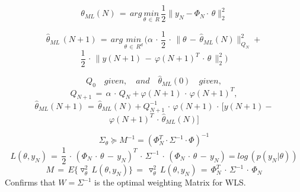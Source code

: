 \begin{tcolorbox}[colback=yellow!5!white,colframe=yellow!75!white,coltitle=black,title=Recursive Linear Least Squares]
\begin{equation*}
\theta _{ ML }(N) \, = \, arg\, \underset { \theta \, \in \, { R } }{ min } \, \frac { 1 }{ 2 } \parallel y_N - \Phi_N\cdot\,\theta{ \parallel  }_{ 2 }^{ 2 }
\end{equation*}

\begin{equation*}
\hat { \theta  } _{ ML }\, (N+1)\, =\, arg\, \underset { \theta \, \in \, { R^{ d } } }{ min } \, (\alpha \, \cdot \, \frac { 1 }{ 2 } \, \cdot \, \parallel \theta \, - \, \hat { \theta  } _{ ML }(N){ \parallel  }_{ Q_{ N } }^{ 2 }+
\end{equation*}
\begin{equation*}
\frac { 1 }{ 2 } \, \cdot \, \parallel y(N+1) \, - \, \varphi (N+1)^{ T }\, \cdot \, \theta \, { \parallel  }_{ 2 }^{ 2 })
\end{equation*}

\begin{equation*}
Q_{ 0 }\quad given,\quad and\quad \hat { \theta  } _{ ML }(0)\quad given,
\end{equation*}
\begin{equation*}
Q_{ N+1 }\, =\, \alpha \, \cdot \, Q_{ N }+\varphi (N+1)\, \cdot \, \varphi (N+1)^{ T },
\end{equation*}
\begin{equation*}
\hat { \theta  } _{ ML }(N+1)\, =\, \hat { \theta  } _{ ML }(N)+Q_{ N+1 }^{ -1 }\, \cdot \, \varphi (N+1)\, \cdot \, [y(N+1)-
\end{equation*}
\begin{equation*}
\varphi(N+1)^T \, \cdot \,\hat{\theta}_{ML}(N)]
\end{equation*}
\end{tcolorbox}

\begin{tcolorbox}[colback=yellow!5!white,colframe=yellow!75!white,coltitle=black,title=Cramer-Rao-Inequality (Fisher information Matrix M)]
\begin{equation*}
{ \Sigma  }_{ \theta  } \succeq M^{-1} = (\Phi^T_N \cdot \Sigma^{-1} \cdot \Phi)^{-1}
\end{equation*}
\begin{equation*}
L(\theta ,y_{ N })\, =\, \frac { 1 }{ 2 } \, \cdot \, (\Phi _{ N }\, \cdot \, \theta \, -\, y_N)^{ T } \, \cdot \, \Sigma^{-1} \, \cdot \,  (\Phi_N \, \cdot \, \theta \, - \, y_N) =log\, (p({ y }_{ N }|\theta))
\end{equation*}
\begin{equation*}
M\, =\, { E }\{ \triangledown ^{ 2 }_{ \theta  }\, L(\theta ,y_{ N })\} \, =\, \triangledown ^{ 2 }_{ \theta  }\, L(\theta ,y_{ N })\, =\, \Phi _{ N }^{ T }\, \cdot \, \Sigma ^{ -1 }\, \cdot \, \Phi _{ N }
\end{equation*}
Confirms that $W = \Sigma^{-1}$ is the optimal weighting Matrix for WLS.
\end{tcolorbox}